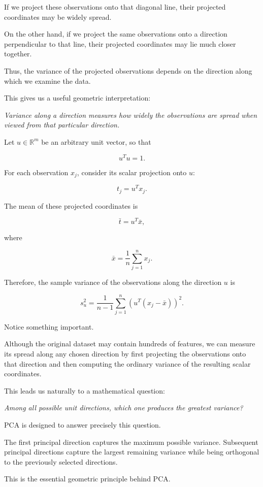 \documentclass[11pt]{article}
\begin{document}
If we project these observations onto
that diagonal line, their projected
coordinates may be widely spread.

On the other hand, if we project the
same observations onto a direction
perpendicular to that line, their
projected coordinates may lie much
closer together.

Thus, the variance of the projected
observations depends on the direction
along which we examine the data.

This gives us a useful geometric
interpretation:

\textit{Variance along a direction
measures how widely the observations
are spread when viewed from that
particular direction.}

Let $u\in\mathbb{R}^m$ be an arbitrary
unit vector, so that

\[
u^Tu=1.
\]

For each observation $x_j$, consider
its scalar projection onto $u$:

\[
t_j=u^Tx_j.
\]

The mean of these projected coordinates
is

\[
\bar{t}
=
u^T\bar{x},
\]

where

\[
\bar{x}=\frac{1}{n}
\sum_{j=1}^{n}x_j.
\]

Therefore, the sample variance of the
observations along the direction $u$ is

\[
\boxed{
s_u^2=
\frac{1}{n-1}
\sum_{j=1}^{n}
\left(u^T(x_j-\bar{x})\right)^2.
}
\]

Notice something important.

Although the original dataset may
contain hundreds of features,
we can measure its spread along
any chosen direction by first
projecting the observations onto
that direction and then computing
the ordinary variance of the
resulting scalar coordinates.

This leads us naturally to a
mathematical question:

\textit{Among all possible unit
directions, which one produces
the greatest variance?}

PCA is designed to answer precisely
this question.

The first principal direction
captures the maximum possible
variance. Subsequent principal
directions capture the largest
remaining variance while being
orthogonal to the previously
selected directions.

This is the essential geometric
principle behind PCA.
\end{document}

